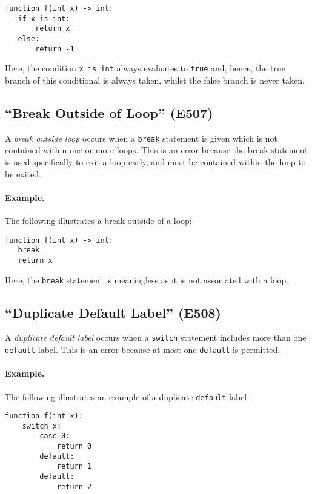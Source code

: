 \begin{lstlisting}
function f(int x) -> int:
   if x is int:
       return x
   else:
       return -1
\end{lstlisting}

Here, the condition \lstinline{x is int} always evaluates to \lstinline{true} and, hence, the true branch of this conditional is always taken, whilst the false branch is never taken.

\subsection{``Break Outside of Loop'' (E507)}

A {\em break outside loop} occurs when a \lstinline{break} statement is given which is not contained within one or more loops.  This is an error because the break statement is used specifically to exit a loop early, and must be contained within the loop to be exited.  

\paragraph{Example.}  The following illustrates a break outside of a loop:

\begin{lstlisting}
function f(int x) -> int:
   break
   return x
\end{lstlisting}

Here, the \lstinline{break} statement is meaningless as it is not associated with a loop.

\subsection{``Duplicate Default Label'' (E508)}
A {\em duplicate default label} occurs when a \lstinline{switch} statement includes more than one \lstinline{default} label.  This is an error because at most one \lstinline{default} is permitted.

\paragraph{Example.}  The following illustrates an example of a duplicate \lstinline{default} label:

\begin{lstlisting}
function f(int x):
    switch x:
        case 0:
            return 0
        default:
            return 1
        default:
            return 2
\end{lstlisting}

